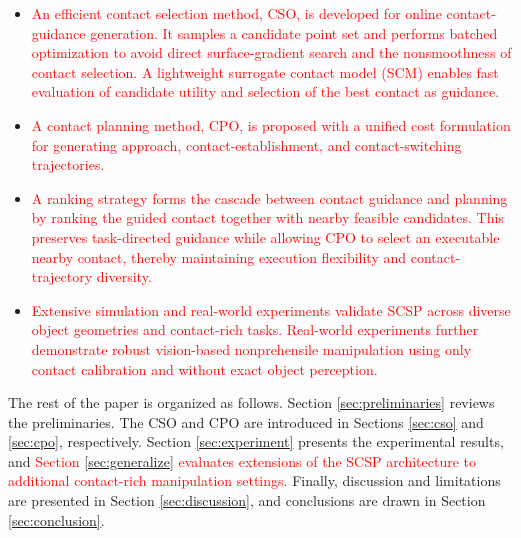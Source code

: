 \begin{itemize}

 \item
 \textcolor{red}{
 An efficient contact selection method, CSO, is developed for online contact-guidance generation. It samples a candidate point set and performs batched optimization to avoid direct surface-gradient search and the nonsmoothness of contact selection. A lightweight surrogate contact model (SCM) enables fast evaluation of candidate utility and selection of the best contact as guidance.
 }

 \item
 \textcolor{red}{
 A contact planning method, CPO, is proposed with a unified cost formulation for generating approach, contact-establishment, and contact-switching trajectories.
 }

 \item
 \textcolor{red}{
 A ranking strategy forms the cascade between contact guidance and planning by ranking the guided contact together with nearby feasible candidates. This preserves task-directed guidance while allowing CPO to select an executable nearby contact, thereby maintaining execution flexibility and contact-trajectory diversity.
 }

 \item
 \textcolor{red}{
 Extensive simulation and real-world experiments validate SCSP across diverse object geometries and contact-rich tasks. Real-world experiments further demonstrate robust vision-based nonprehensile manipulation using only contact calibration and without exact object perception.
 }

\end{itemize}

The rest of the paper is organized as follows. Section \ref{sec:preliminaries} reviews the preliminaries. The CSO and CPO are introduced in Sections \ref{sec:cso} and \ref{sec:cpo}, respectively. Section \ref{sec:experiment} presents the experimental results, and
\textcolor{red}{
Section \ref{sec:generalize} evaluates extensions of the SCSP architecture to additional contact-rich manipulation settings.
}
Finally, discussion and limitations are presented in Section \ref{sec:discussion}, and conclusions are drawn in Section \ref{sec:conclusion}.
